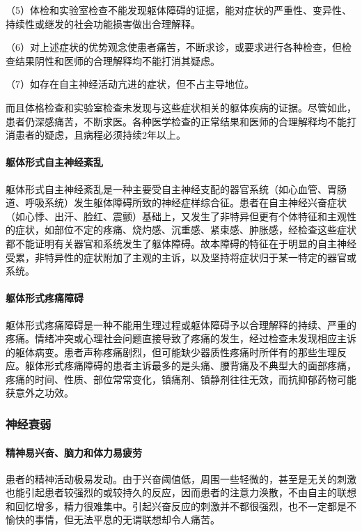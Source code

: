 （5）体检和实验室检查不能发现躯体障碍的证据，能对症状的严重性、变异性、持续性或继发的社会功能损害做出合理解释。

（6）对上述症状的优势观念使患者痛苦，不断求诊，或要求进行各种检查，但检查结果阴性和医师的合理解释均不能打消其疑虑。

（7）如存在自主神经活动亢进的症状，但不占主导地位。

而且体格检查和实验室检查未发现与这些症状相关的躯体疾病的证据。尽管如此，患者仍深感痛苦，不断求医。各种医学检查的正常结果和医师的合理解释均不能打消患者的疑虑，且病程必须持续2年以上。
\paragraph{躯体形式自主神经紊乱}

躯体形式自主神经紊乱是一种主要受自主神经支配的器官系统（如心血管、胃肠道、呼吸系统）发生躯体障碍所致的神经症样综合征。患者在自主神经兴奋症状（如心悸、出汗、脸红、震颤）基础上，又发生了非特异但更有个体特征和主观性的症状，如部位不定的疼痛、烧灼感、沉重感、紧束感、肿胀感，经检查这些症状都不能证明有关器官和系统发生了躯体障碍。故本障碍的特征在于明显的自主神经受累，非特异性的症状附加了主观的主诉，以及坚持将症状归于某一特定的器官或系统。
\paragraph{躯体形式疼痛障碍}

躯体形式疼痛障碍是一种不能用生理过程或躯体障碍予以合理解释的持续、严重的疼痛。情绪冲突或心理社会问题直接导致了疼痛的发生，经过检查未发现相应主诉的躯体病变。患者声称疼痛剧烈，但可能缺少器质性疼痛时所伴有的那些生理反应。躯体形式疼痛障碍的患者主诉最多的是头痛、腰背痛及不典型大的面部疼痛，疼痛的时间、性质、部位常常变化，镇痛剂、镇静剂往往无效，而抗抑郁药物可能获意外之功效。

\subsubsection{神经衰弱}
\paragraph{精神易兴奋、脑力和体力易疲劳}

患者的精神活动极易发动。由于兴奋阈值低，周围一些轻微的，甚至是无关的刺激也能引起患者较强烈的或较持久的反应，因而患者的注意力涣散，不由自主的联想和回忆增多，精力很难集中。引起兴奋反应的刺激并不都很强烈，也不一定都是不愉快的事情，但无法平息的无谓联想却令人痛苦。

